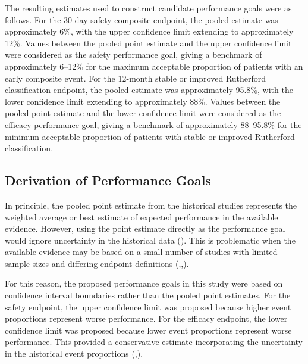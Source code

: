 \documentclass{article}
\begin{document}
The resulting estimates used to construct candidate performance goals
were as follows. For the 30-day safety composite endpoint, the pooled
estimate was approximately 6\%, with the upper confidence limit
extending to approximately 12\%. Values between the pooled point
estimate and the upper confidence limit were considered as the safety
performance goal, giving a benchmark of approximately 6--12\% for the
maximum acceptable proportion of patients with an early composite event.
For the 12-month stable or improved Rutherford classification endpoint,
the pooled estimate was approximately 95.8\%, with the lower confidence
limit extending to approximately 88\%. Values between the pooled point
estimate and the lower confidence limit were considered as the efficacy
performance goal, giving a benchmark of approximately 88--95.8\% for the
minimum acceptable proportion of patients with stable or improved
Rutherford classification.

\subsection{Derivation of Performance
Goals}\label{derivation-of-performance-goals}

In principle, the pooled point estimate from the historical studies
represents the weighted average or best estimate of expected performance
in the available evidence. However, using the point estimate directly as
the performance goal would ignore uncertainty in the historical data
(). This is problematic when the
available evidence may be based on a small number of studies with
limited sample sizes and differing endpoint definitions
(,,).

For this reason, the proposed performance goals in this study were based
on confidence interval boundaries rather than the pooled point
estimates. For the safety endpoint, the upper confidence limit was
proposed because higher event proportions represent worse performance.
For the efficacy endpoint, the lower confidence limit was proposed
because lower event proportions represent worse performance. This
provided a conservative estimate incorporating the uncertainty in the
historical event proportions
(,).

\newpage
\end{document}
